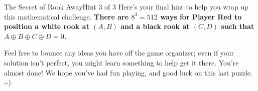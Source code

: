 \begin{metapuzzle}{The Secret of Rook Away}{Hint 3 of 3}
  Here's your final hint to help you wrap up this mathematical
  challenge. \textbf{There are \(8^3=512\) ways for Player Red
  to position a white rook at
  \((A,B)\) and a black rook at \((C,D)\) such that
  \(A\oplus B\oplus C\oplus D=0\).}

  \vspace{3em}

  Feel free to bounce any ideas you have off the game organizer; even if your
  solution isn't perfect, you might learn something to help get it there.
  You're almost done! We hope you've had fun playing, and good luck on this
  last puzzle. :-)

\end{metapuzzle}
